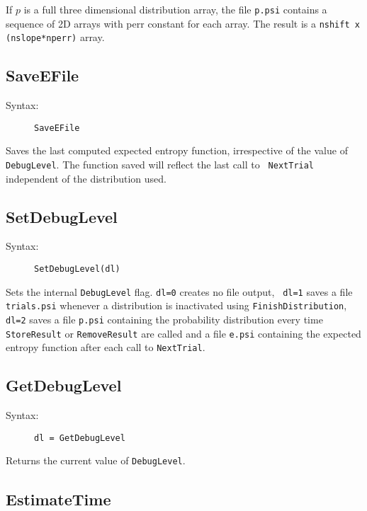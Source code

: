 \documentclass[10pt,letterpaper]{article}
\begin{document}
If $p$ is a full three dimensional distribution array, the file {\tt p.psi} 
contains a sequence of 2D arrays with perr constant for each array. The result 
is a {\tt nshift x (nslope*nperr)} array.

\subsection{SaveEFile}

\begin{description}
\item[Syntax:] {\tt SaveEFile}
\end{description}

Saves the last computed expected entropy function, irrespective of the value of 
{\tt DebugLevel}. The function saved will reflect the last call to {\tt 
NextTrial} independent of the distribution used.

\subsection{SetDebugLevel}

\begin{description}
\item[Syntax:] {\tt SetDebugLevel(dl)}
\end{description}

Sets the internal {\tt DebugLevel} flag. {\tt dl=0} creates no file output, {\tt 
dl=1} saves a file {\tt trials.psi} whenever a distribution is inactivated using 
{\tt FinishDistribution}, {\tt dl=2} saves a file {\tt p.psi} containing the 
probability distribution every time {\tt StoreResult} or {\tt RemoveResult} are 
called and a file {\tt e.psi} containing the expected entropy function after each
call to {\tt NextTrial}.

\subsection{GetDebugLevel}

\begin{description}
\item[Syntax:] {\tt dl = GetDebugLevel}
\end{description}

Returns the current value of {\tt DebugLevel}.

\subsection{EstimateTime}
\end{document}
